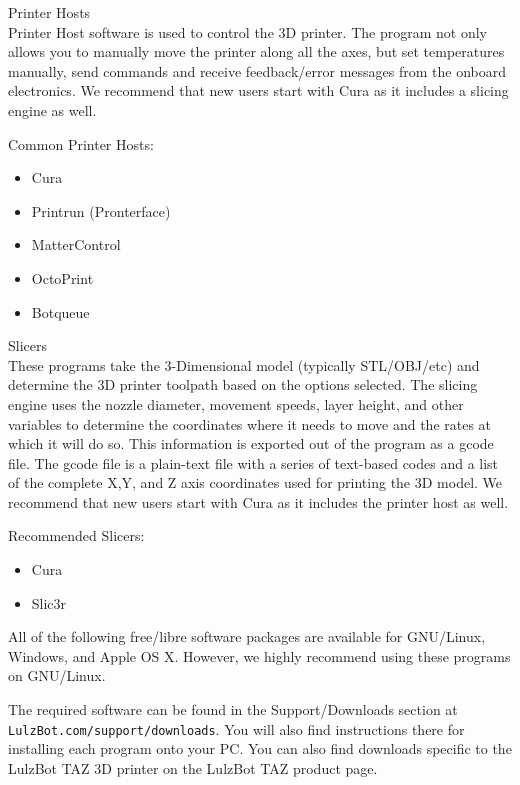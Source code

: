 \begin{description}
\item{Printer Hosts} \hfill \\
Printer Host software is used to control the 3D printer. The program not only allows you to manually move the printer along all the axes, but set temperatures manually, send commands and receive feedback/error messages from the onboard electronics. We recommend that new users start with Cura as it includes a slicing engine as well.

Common Printer Hosts:
\begin{itemize}
\item Cura
\item Printrun (Pronterface)
\item MatterControl
\item OctoPrint
\item Botqueue
\end{itemize}

\item{Slicers} \hfill \\
These programs take the 3-Dimensional model (typically STL/OBJ/etc) and determine the 3D printer toolpath based on the options selected. The slicing engine uses the nozzle diameter, movement speeds, layer height, and other variables to determine the coordinates where it needs to move and the rates at which it will do so. This information is exported out of the program as a gcode file. The gcode file is a plain-text file with a series of text-based codes and a list of the complete X,Y, and Z axis coordinates used for printing the 3D model. We recommend that new users start with Cura as it includes the printer host as well.

Recommended Slicers:
\begin{itemize}
\item Cura
\item Slic3r
\end{itemize}

\end{description}

All of the following free/libre software packages are available for GNU/Linux, Windows, and Apple OS X. However, we highly recommend using these programs on GNU/Linux.

The required software can be found in the Support/Downloads section at \texttt{LulzBot.com/support/downloads}. You will also find instructions there for installing each program onto your PC. You can also find downloads specific to the LulzBot\textsuperscript{\miniscule{\texttrademark}} TAZ 3D printer on the LulzBot\textsuperscript{\miniscule{\texttrademark}} TAZ product page.

